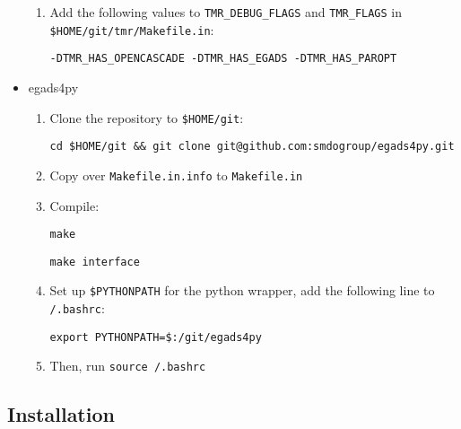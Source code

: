\documentclass{article}
\begin{document}
\begin{itemize}
\begin{enumerate}
        \item Add the following values to \texttt{TMR\string_DEBUG\string_FLAGS} and
        \texttt{TMR\string_FLAGS} in \texttt{\$HOME/git/tmr/Makefile.in}:

        \texttt{-DTMR\string_HAS\string_OPENCASCADE -DTMR\string_HAS\string_EGADS
        -DTMR\string_HAS\string_PAROPT}


    \end{enumerate}

    \item egads4py

    \begin{enumerate}
        \item Clone the repository to \texttt{\$HOME/git}:

        \texttt{cd \$HOME/git \&\& git clone git@github.com:smdogroup/egads4py.git}

        \item Copy over \texttt{Makefile.in.info} to \texttt{Makefile.in}

        \item Compile:

        \texttt{make}

        \texttt{make interface}

        \item Set up \texttt{\$PYTHONPATH} for the python wrapper,
        add the following line to \texttt{\texttildelow/.bashrc}:

        \texttt{export PYTHONPATH=\$:\texttildelow/git/egads4py}

        \item Then, run \texttt{source \texttildelow/.bashrc}

    \end{enumerate}

\end{itemize}


\subsection{Installation}
\end{document}
